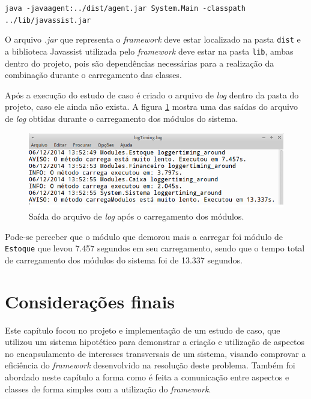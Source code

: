 \documentclass[tc,oneside]{iiufrgs}
\begin{document}
\begin{center}
\texttt{java -javaagent:../dist/agent.jar System.Main -classpath ../lib/javassist.jar}
\end{center}

O arquivo \textit{.jar} que representa o \textit{framework} deve estar localizado na pasta \texttt{dist} e a biblioteca Javassist utilizada pelo \textit{framework} deve estar na pasta \texttt{lib}, ambas dentro do projeto, pois são dependências necessárias para a realização da combinação durante o carregamento das classes.

Após a execução do estudo de caso é criado o arquivo de \textit{log} dentro da pasta do projeto, caso ele ainda não exista. A figura \ref{fig:saidaarquivolog} mostra uma das saídas do arquivo de \textit{log} obtidas durante o carregamento dos módulos do sistema.

\begin{figure}[ht]
	\centering
	\includegraphics[scale=0.5]{figuras/estudo/saidaarquivolog.png}
	\caption{Saída do arquivo de \textit{log} após o carregamento dos módulos.}
	\label{fig:saidaarquivolog}
\end{figure}

Pode-se perceber que o módulo que demorou mais a carregar foi módulo de \texttt{Estoque} que levou 7.457 segundos em seu carregamento, sendo que o tempo total de carregamento dos módulos do sistema foi de 13.337 segundos.

\section{Considerações finais}

Este capítulo focou no projeto e implementação de um estudo de caso, que utilizou um sistema hipotético para demonstrar a criação e utilização de aspectos no encapsulamento de interesses transversais de um sistema, visando comprovar a eficiência do \textit{framework} desenvolvido na resolução deste problema. Também foi abordado neste capítulo a forma como é feita a comunicação entre aspectos e classes de forma simples com a utilização do \textit{framework}.
\end{document}
